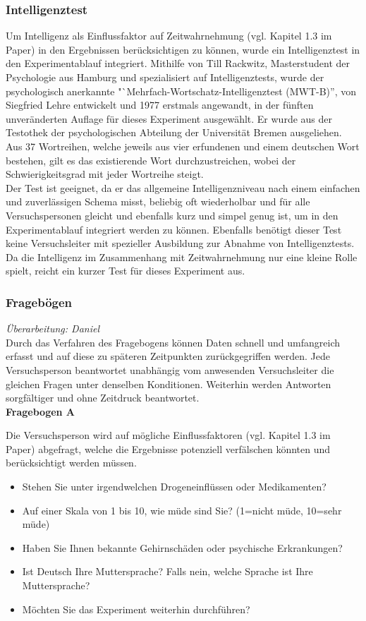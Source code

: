 \documentclass{Bericht}
\begin{document}
\subsubsection{Intelligenztest}
Um Intelligenz als Einflussfaktor auf Zeitwahrnehmung (vgl. Kapitel 1.3 im Paper) in den Ergebnissen berücksichtigen zu können, wurde ein Intelligenztest in den Experimentablauf integriert.
Mithilfe von Till Rackwitz, Masterstudent der Psychologie aus Hamburg und spezialisiert auf Intelligenztests, wurde der psychologisch anerkannte "`Mehrfach-Wortschatz-Intelligenztest (MWT-B)'', von Siegfried Lehre entwickelt und 1977 erstmals angewandt, in der fünften unveränderten Auflage für dieses Experiment ausgewählt. Er wurde aus der Testothek der psychologischen Abteilung der Universität Bremen ausgeliehen.\\
Aus 37 Wortreihen, welche jeweils aus vier erfundenen und einem deutschen Wort bestehen, gilt es das existierende Wort durchzustreichen, wobei der Schwierigkeitsgrad mit jeder Wortreihe steigt.\\
Der Test ist geeignet, da er das allgemeine Intelligenzniveau nach einem einfachen und zuverlässigen Schema misst, beliebig oft wiederholbar und für alle Versuchspersonen gleicht und ebenfalls kurz und simpel genug ist, um in den Experimentablauf integriert werden zu können. Ebenfalls benötigt dieser Test keine Versuchsleiter mit spezieller Ausbildung zur Abnahme von Intelligenztests. 
Da die Intelligenz im Zusammenhang mit Zeitwahrnehmung nur eine kleine Rolle spielt, reicht ein kurzer Test für dieses Experiment aus. 

\subsubsection{Fragebögen}
\textit{Überarbeitung: Daniel}\\
Durch das Verfahren des Fragebogens können Daten schnell und umfangreich erfasst und auf diese zu späteren Zeitpunkten zurückgegriffen werden. Jede Versuchsperson beantwortet unabhängig vom anwesenden Versuchsleiter die gleichen Fragen unter denselben Konditionen. Weiterhin werden Antworten sorgfältiger und ohne Zeitdruck beantwortet.\\

\label{subsec:fragebogen}
\textbf{Fragebogen A}

Die Versuchsperson wird auf mögliche Einflussfaktoren (vgl. Kapitel 1.3 im Paper) abgefragt, welche die Ergebnisse potenziell verfälschen könnten und berücksichtigt werden müssen.
\begin{itemize}
	\setlength{\itemsep}{0em}
	\item Stehen Sie unter irgendwelchen Drogeneinflüssen oder Medikamenten?
	\item Auf einer Skala von 1 bis 10, wie müde sind Sie? (1=nicht müde, 10=sehr müde)
	\item Haben Sie Ihnen bekannte Gehirnschäden oder psychische Erkrankungen?
	\item Ist Deutsch Ihre Muttersprache? Falls nein, welche Sprache ist Ihre Muttersprache?
	\item Möchten Sie das Experiment weiterhin durchführen?
\end{itemize}
\end{document}
